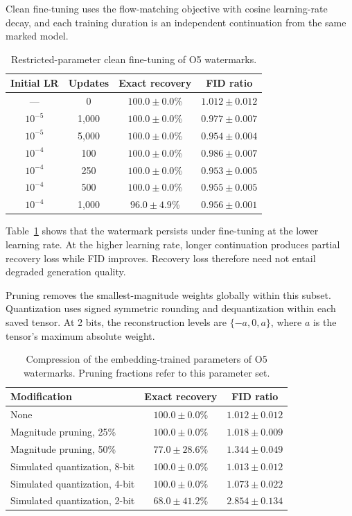 \documentclass[11pt]{article}
\begin{document}
Clean fine-tuning uses the flow-matching objective with cosine
learning-rate decay, and each training duration is an independent
continuation from the same marked model.

\begin{table}[t]
\centering
\caption{Restricted-parameter clean fine-tuning of O5 watermarks.}
\label{tab:clean-finetune}
\small
\begin{tabular}{cccc}
\toprule
Initial LR & Updates & Exact recovery & FID ratio \\
\midrule
--- & 0 & $100.0{\pm}0.0$\% & $1.012{\pm}0.012$ \\
$10^{-5}$ & 1,000 & $100.0{\pm}0.0$\% & $0.977{\pm}0.007$ \\
$10^{-5}$ & 5,000 & $100.0{\pm}0.0$\% & $0.954{\pm}0.004$ \\
\midrule
$10^{-4}$ & 100 & $100.0{\pm}0.0$\% & $0.986{\pm}0.007$ \\
$10^{-4}$ & 250 & $100.0{\pm}0.0$\% & $0.953{\pm}0.005$ \\
$10^{-4}$ & 500 & $100.0{\pm}0.0$\% & $0.955{\pm}0.005$ \\
$10^{-4}$ & 1,000 & $96.0{\pm}4.9$\% & $0.956{\pm}0.001$ \\
\bottomrule
\end{tabular}
\end{table}

Table~\ref{tab:clean-finetune} shows that the watermark persists under
fine-tuning at the lower learning rate. At the higher learning rate,
longer continuation produces partial recovery loss while FID improves.
Recovery loss therefore need not entail degraded generation quality.

Pruning removes the smallest-magnitude weights globally within this subset.
Quantization uses signed symmetric rounding and dequantization within
each saved tensor. At 2 bits, the reconstruction levels are
$\{-a,0,a\}$, where $a$ is the tensor's maximum absolute weight.

\begin{table}[t]
\centering
\caption{Compression of the embedding-trained parameters of O5
watermarks. Pruning fractions refer to this parameter set.}
\label{tab:pruning-quantization}
\small
\begin{tabular}{lcc}
\toprule
Modification & Exact recovery & FID ratio \\
\midrule
None & $100.0{\pm}0.0$\% & $1.012{\pm}0.012$ \\
Magnitude pruning, 25\% & $100.0{\pm}0.0$\% & $1.018{\pm}0.009$ \\
Magnitude pruning, 50\% & $77.0{\pm}28.6$\% & $1.344{\pm}0.049$ \\
Simulated quantization, 8-bit & $100.0{\pm}0.0$\% & $1.013{\pm}0.012$ \\
Simulated quantization, 4-bit & $100.0{\pm}0.0$\% & $1.073{\pm}0.022$ \\
Simulated quantization, 2-bit & $68.0{\pm}41.2$\% & $2.854{\pm}0.134$ \\
\bottomrule
\end{tabular}
\end{table}
\end{document}
